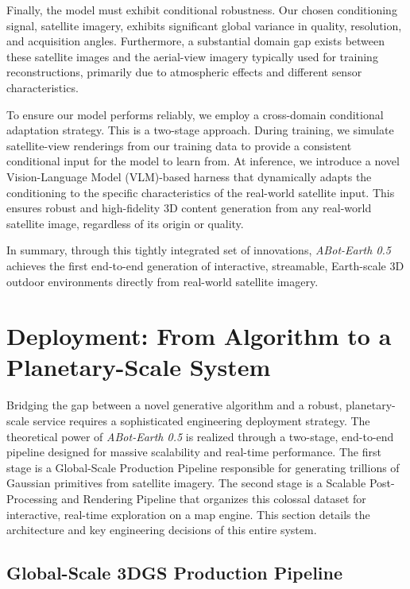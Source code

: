 \documentclass{llmxive}
\providecommand{\method}{\textit{ABot-Earth 0.5}\xspace}
\begin{document}
Finally, the model must exhibit {conditional robustness}. Our chosen conditioning signal, satellite imagery, exhibits significant global variance in quality, resolution, and acquisition angles. Furthermore, a substantial domain gap exists between these satellite images and the aerial-view imagery typically used for training reconstructions, primarily due to atmospheric effects and different sensor characteristics.

To ensure our model performs reliably, we employ a cross-domain conditional adaptation strategy. This is a two-stage approach. During training, we simulate satellite-view renderings from our training data to provide a consistent conditional input for the model to learn from. At inference, we introduce a novel Vision-Language Model (VLM)-based harness that dynamically adapts the conditioning to the specific characteristics of the real-world satellite input. This ensures robust and high-fidelity 3D content generation from any real-world satellite image, regardless of its origin or quality.

In summary, through this tightly integrated set of innovations, \method{} achieves the first end-to-end generation of interactive, streamable, Earth-scale 3D outdoor environments directly from real-world satellite imagery.
\section{Deployment: From Algorithm to a Planetary-Scale System}
\label{sec:deployment}

Bridging the gap between a novel generative algorithm and a robust, planetary-scale service requires a sophisticated engineering deployment strategy. The theoretical power of \method{} is realized through a two-stage, end-to-end pipeline designed for massive scalability and real-time performance. The first stage is a {Global-Scale Production Pipeline} responsible for generating trillions of Gaussian primitives from satellite imagery. The second stage is a {Scalable Post-Processing and Rendering Pipeline} that organizes this colossal dataset for interactive, real-time exploration on a map engine. This section details the architecture and key engineering decisions of this entire system.

\subsection{Global-Scale 3DGS Production Pipeline}
\end{document}
